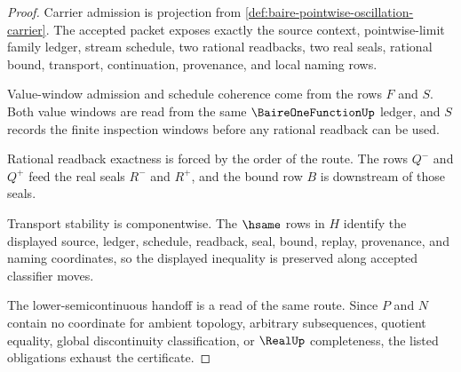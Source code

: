 \begin{proof}
Carrier admission is projection from \autoref{def:baire-pointwise-oscillation-carrier}. The accepted packet exposes exactly the source context, pointwise-limit family ledger, stream schedule, two rational readbacks, two real seals, rational bound, transport, continuation, provenance, and local naming rows.

Value-window admission and schedule coherence come from the rows $F$ and $S$. Both value windows are read from the same $\BaireOneFunctionUp$ ledger, and $S$ records the finite inspection windows before any rational readback can be used.

Rational readback exactness is forced by the order of the route. The rows $Q^-$ and $Q^+$ feed the real seals $R^-$ and $R^+$, and the bound row $B$ is downstream of those seals.

Transport stability is componentwise. The $\hsame$ rows in $H$ identify the displayed source, ledger, schedule, readback, seal, bound, replay, provenance, and naming coordinates, so the displayed inequality is preserved along accepted classifier moves.

The lower-semicontinuous handoff is a read of the same route. Since $P$ and $N$ contain no coordinate for ambient topology, arbitrary subsequences, quotient equality, global discontinuity classification, or $\RealUp$ completeness, the listed obligations exhaust the certificate.
\end{proof}

